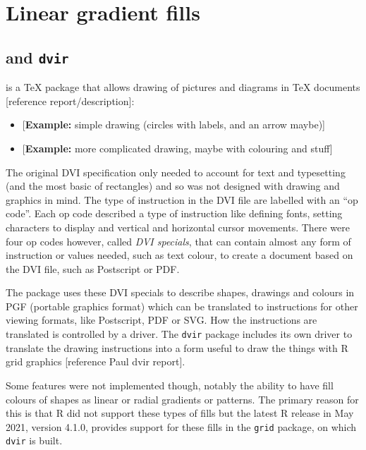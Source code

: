 \documentclass[]{article}
\begin{document}
\newpage{}

\section{Linear gradient fills}\label{linear-gradient-fills}

\subsection{\texorpdfstring{\Tikz{} and
\texttt{dvir}}{ and dvir}}\label{and-dvir}

\Tikz{} is a \TeX{} package that allows drawing of pictures and diagrams
in \TeX{} documents {[}reference \Tikz{} report/description{]}:

\begin{itemize}
\item
  {[}\textbf{Example:} simple \Tikz{} drawing (circles with labels, and
  an arrow maybe){]}
\item
  {[}\textbf{Example:} more complicated \Tikz{} drawing, maybe with
  colouring and stuff{]}
\end{itemize}

The original DVI specification only needed to account for text and
typesetting (and the most basic of rectangles) and so was not designed
with drawing and graphics in mind. The type of instruction in the DVI
file are labelled with an ``op code''. Each op code described a type of
instruction like defining fonts, setting characters to display and
vertical and horizontal cursor movements. There were four op codes
however, called \emph{DVI specials}, that can contain almost any form of
instruction or values needed, such as text colour, to create a document
based on the DVI file, such as Postscript or PDF.

The \Tikz{} package uses these DVI specials to describe shapes, drawings
and colours in PGF (portable graphics format) which can be translated to
instructions for other viewing formats, like Postscript, PDF or SVG. How
the instructions are translated is controlled by a \Tikz{} driver. The
\texttt{dvir} package includes its own \Tikz{} driver to translate the
drawing instructions into a form useful to draw the things with R grid
graphics {[}reference Paul dvir \Tikz{} report{]}.

Some \Tikz{} features were not implemented though, notably the ability
to have fill colours of shapes as linear or radial gradients or
patterns. The primary reason for this is that R did not support these
types of fills but the latest R release in May 2021, version 4.1.0,
provides support for these fills in the \texttt{grid} package, on which
\texttt{dvir} is built.
\end{document}
